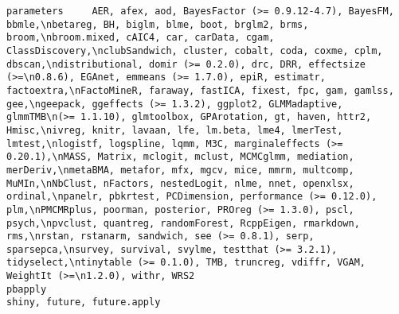 \documentclass[
  letterpaper,
  DIV=11,
  numbers=noendperiod]{scrreprt}
\begin{document}
\begin{verbatim}
parameters     AER, afex, aod, BayesFactor (>= 0.9.12-4.7), BayesFM, bbmle,\nbetareg, BH, biglm, blme, boot, brglm2, brms, broom,\nbroom.mixed, cAIC4, car, carData, cgam, ClassDiscovery,\nclubSandwich, cluster, cobalt, coda, coxme, cplm, dbscan,\ndistributional, domir (>= 0.2.0), drc, DRR, effectsize (>=\n0.8.6), EGAnet, emmeans (>= 1.7.0), epiR, estimatr, factoextra,\nFactoMineR, faraway, fastICA, fixest, fpc, gam, gamlss, gee,\ngeepack, ggeffects (>= 1.3.2), ggplot2, GLMMadaptive, glmmTMB\n(>= 1.1.10), glmtoolbox, GPArotation, gt, haven, httr2, Hmisc,\nivreg, knitr, lavaan, lfe, lm.beta, lme4, lmerTest, lmtest,\nlogistf, logspline, lqmm, M3C, marginaleffects (>= 0.20.1),\nMASS, Matrix, mclogit, mclust, MCMCglmm, mediation, merDeriv,\nmetaBMA, metafor, mfx, mgcv, mice, mmrm, multcomp, MuMIn,\nNbClust, nFactors, nestedLogit, nlme, nnet, openxlsx, ordinal,\npanelr, pbkrtest, PCDimension, performance (>= 0.12.0), plm,\nPMCMRplus, poorman, posterior, PROreg (>= 1.3.0), pscl, psych,\npvclust, quantreg, randomForest, RcppEigen, rmarkdown, rms,\nrstan, rstanarm, sandwich, see (>= 0.8.1), serp, sparsepca,\nsurvey, survival, svylme, testthat (>= 3.2.1), tidyselect,\ntinytable (>= 0.1.0), TMB, truncreg, vdiffr, VGAM, WeightIt (>=\n1.2.0), withr, WRS2
pbapply                                                                                                                                                                                                                                                                                                                                                                                                                                                                                                                                                                                                                                                                                                                                                                                                                                                                                                                                                                                                                                                                                                                                                                                                                                                                           shiny, future, future.apply

\end{verbatim}
\end{document}
